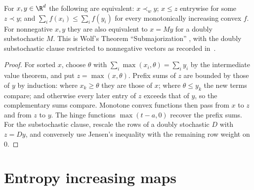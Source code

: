 \begin{theorem}[Submajorization]
    \label{thm:vector_submajorization}
    \leanok
    For $x,y\in\R^d$ the following are equivalent: $x\prec_wy$; $x\le z$
    entrywise for some $z\prec y$; and $\sum_if(x_i)\le\sum_if(y_i)$ for every
    monotonically increasing convex $f$. For nonnegative $x,y$ they are also
    equivalent to $x=My$ for a doubly substochastic $M$. This is Wolf's
    Theorem ``Submajorization'' \cite{Wolf2012Quantum}, with the doubly
    substochastic clause restricted to nonnegative vectors as recorded
    in~\cite{gap:wolf_ch8_submajorization_nonnegative}.
\end{theorem}
\begin{proof}\leanok
    For sorted $x$, choose $\theta$ with $\sum_i\max(x_i,\theta)=\sum_iy_i$ by
    the intermediate value theorem, and put $z=\max(x,\theta)$. Prefix sums of
    $z$ are bounded by those of $y$ by induction: where $x_k\ge\theta$ they are
    those of $x$; where $\theta\le y_k$ the new terms compare; and otherwise
    every later entry of $z$ exceeds that of $y$, so the complementary sums
    compare. Monotone convex functions then pass from $x$ to $z$ and from $z$
    to $y$. The hinge functions $\max(t-a,0)$ recover the prefix sums. For the
    substochastic clause, rescale the rows of a doubly stochastic $D$ with
    $z=Dy$, and conversely use Jensen's inequality with the remaining row weight
    on $0$.
\end{proof}

\section{Entropy increasing maps}


